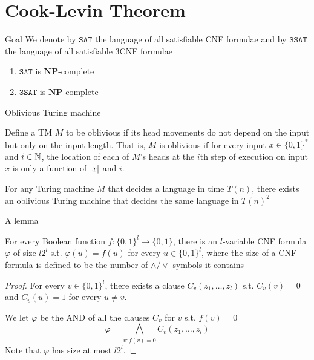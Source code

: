 \documentclass[presentation]{beamer}
\def \NP {\textbf{NP}}
\def \NP {\textbf{NP}}
\def \SAT {\texttt{SAT}}
\def \TSAT {\texttt{3SAT}}
\begin{document}
\section{Cook-Levin Theorem}
\label{sec:orgfbb95fb}
\begin{frame}[label={sec:org5bfd38b}]{Goal}
We denote by \(\SAT\) the language of all satisfiable CNF formulae and by \(\TSAT\) the
language of all satisfiable 3CNF formulae

\begin{theorem}
\begin{enumerate}
\item \(\SAT\) is \(\NP\)-complete
\item \(\TSAT\) is \(\NP\)-complete
\end{enumerate}
\end{theorem}
\end{frame}

\begin{frame}[label={sec:orgcbb53be}]{Oblivious Turing machine}
\begin{definition}[]
Define a TM \(M\) to be \alert{oblivious} if its head movements do not depend on the input but only on
the input length. That is, \(M\) is oblivious if for every input \(x\in\{0,1\}^*\) and \(i\in\mathbb{N}\), the
location of each of \(M\)'s heads at the \(i\)th step of execution on input \(x\) is only a
function of \(\abs{x}\) and \(i\).
\end{definition}

\begin{theorem}[]
For any Turing machine \(M\) that decides a language in time \(T(n)\), there exists an oblivious
Turing machine that decides the same language in \(T(n)^2\)
\end{theorem}
\end{frame}
\begin{frame}[label={sec:org640ff4a}]{A lemma}
\begin{lemma}[]
For every Boolean function \(f:\{0,1\}^l\to\{0,1\}\), there is an \(l\)-variable CNF formula \(\varphi\)
of size \(l2^l\) s.t. \(\varphi(u)=f(u)\) for every \(u\in\{0,1\}^l\), where the size of a CNF
formula is defined to be the number of \(\wedge/\vee\) symbols it contains
\end{lemma}

\begin{proof}
For every \(v\in\{0,1\}^l\), there exists a clause \(C_v(z_1,\dots,z_l)\) s.t. \(C_v(v)=0\)
and \(C_v(u)=1\) for every \(u\neq v\).

We let \(\varphi\) be the AND of all the clauses \(C_v\) for \(v\) s.t. \(f(v)=0\)
     \begin{equation*}
\varphi=\bigwedge_{v:f(v)=0}C_v(z_1,\dots,z_l)
     \end{equation*}
Note that \(\varphi\) has size at most \(l2^l\).
\end{proof}
\end{frame}
\end{document}
